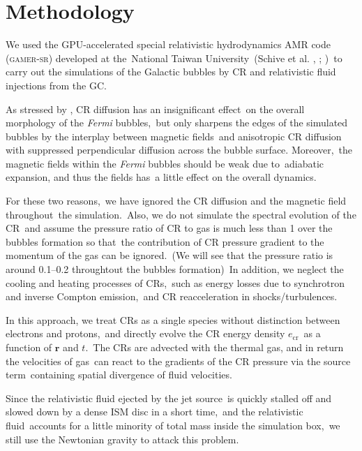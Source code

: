 \documentclass[twocolumn]{aastex631}
\begin{document}
\section{Methodology}
\label{Methodology}
  We used the GPU-accelerated special relativistic hydrodynamics AMR code (\textsc{gamer-sr}) developed at the\
  National Taiwan University\
  (Schive et al. \citeyear{gamer-1}, \citeyear{gamer-2}; \citeauthor{tseng2021} \citeyear{tseng2021})\
  to carry out the simulations of the Galactic bubbles by CR and relativistic fluid injections from the GC.

  As stressed by \citet{Yang2012}, CR diffusion has an insignificant effect\
  on the overall morphology of the \textit{Fermi} bubbles,\
  but only sharpens the edges of the simulated bubbles by the interplay between magnetic fields\
  and anisotropic CR diffusion with suppressed perpendicular diffusion across the bubble surface. Moreover,\
  the magnetic fields within the \textit{Fermi} bubbles should be weak due to\
  adiabatic expansion, and thus the fields has\
  a little effect on the overall dynamics.

  For these two reasons,\
  we have ignored the CR diffusion and the magnetic field throughout\
  the simulation.\
  Also, we do not simulate the spectral evolution of the CR\
  and assume the pressure ratio of CR to gas is much less than 1 over the bubbles formation so that\
  the contribution of CR pressure gradient to the momentum of the gas can be ignored.\
  (We will see that the pressure ratio is around 0.1--0.2 throughtout the bubbles formation)\
  In addition, we neglect the cooling and heating processes of CRs,\
  such as energy losses due to synchrotron and inverse Compton emission,\
  and CR reacceleration in shocks/turbulences.

  In this approach, we treat CRs as a single species without distinction between electrons and protons,\
  and directly evolve the CR energy density $e_{\text{cr}}$\
  as a function of $\mathbf{r}$ and $t$.\
  The CRs are advected with the thermal gas, and in return the velocities of gas\
  can react to the gradients of the CR pressure via the source term\
  containing spatial divergence of fluid velocities.


  Since the relativistic fluid ejected by the jet source\
  is quickly stalled off and slowed down by a dense ISM disc in a short time,\
  and the relativistic fluid\
  accounts for a little minority of total mass inside the simulation box,\
  we still use the Newtonian gravity to attack this problem.
\end{document}
